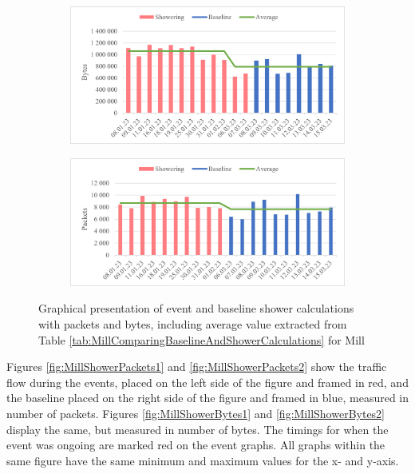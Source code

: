 \begin{figure}[H]
    \centering
    \begin{subfigure}{0.8\textwidth}
        \centering
        \includegraphics[width=1\hsize]{figures/Mill_Shower_Calculations_Bytes.png} 
    \end{subfigure}
    \begin{subfigure}{0.8\textwidth}
        \centering
        \includegraphics[width=1\hsize]{figures/Mill_Shower_Calculations_Packets.png} 
    \end{subfigure}
    \caption{Graphical presentation of event and baseline shower calculations with packets and bytes, including average value extracted from Table \ref{tab:MillComparingBaselineAndShowerCalculations} for Mill}
    \label{fig:MillShowerCalculations}
\end{figure}

Figures \ref{fig:MillShowerPackets1} and \ref{fig:MillShowerPackets2} show the traffic flow during the events, placed on the left side of the figure and framed in red, and the baseline placed on the right side of the figure and framed in blue, measured in number of packets. Figures \ref{fig:MillShowerBytes1} and \ref{fig:MillShowerBytes2} display the same, but measured in number of bytes. The timings for when the event was ongoing are marked red on the event graphs. All graphs within the same figure have the same minimum and maximum values for the x- and y-axis. 

